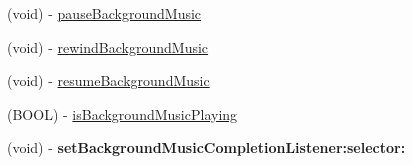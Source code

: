 \begin{DoxyCompactItemize}
(void) -\/ \hyperlink{interfaceCDAudioManager_acbd505494ec2f01e484dfca635b208b8}{pause\+Background\+Music}
\item 
(void) -\/ \hyperlink{interfaceCDAudioManager_a98e99a2b9eabcf89ad7419f6f809c65a}{rewind\+Background\+Music}
\item 
(void) -\/ \hyperlink{interfaceCDAudioManager_a9bcc620677df7b828dd69c951b445062}{resume\+Background\+Music}
\item 
(B\+O\+OL) -\/ \hyperlink{interfaceCDAudioManager_a3b519950dee5dd8e79c8bbbf3c0f7e26}{is\+Background\+Music\+Playing}
\item 
\mbox{\label{interfaceCDAudioManager_ae333be8046b55eabda5cd6ffbf1ecf9b}} 
(void) -\/ {\bfseries set\+Background\+Music\+Completion\+Listener\+:selector\+:}
\end{DoxyCompactItemize}
